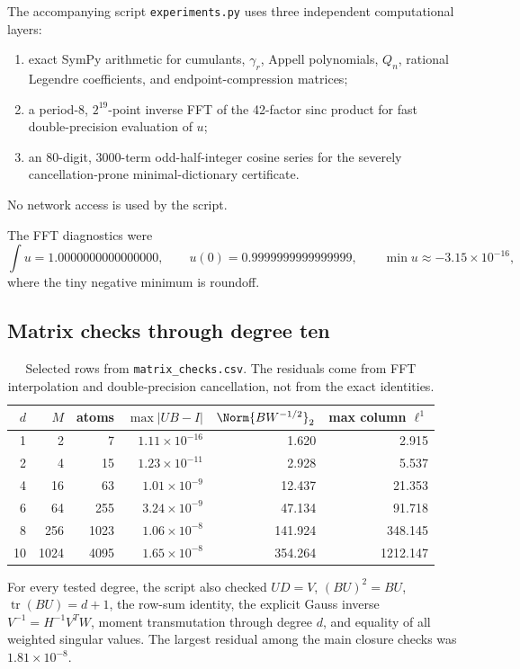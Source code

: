 \documentclass[11pt]{article}
\theoremstyle{definition}
\theoremstyle{remark}
\newcommand{\tr}{\operatorname{tr}}
\begin{document}
The accompanying script \texttt{experiments.py} uses three independent
computational layers:
\begin{enumerate}
  \item exact SymPy arithmetic for cumulants, $\gamma_r$, Appell polynomials,
  $Q_n$, rational Legendre coefficients, and endpoint-compression matrices;
  \item a period-$8$, $2^{19}$-point inverse FFT of the 42-factor sinc product
  for fast double-precision evaluation of $u$;
  \item an 80-digit, 3000-term odd-half-integer cosine series for the severely
  cancellation-prone minimal-dictionary certificate.
\end{enumerate}
No network access is used by the script.

The FFT diagnostics were
\[
 \int u=1.0000000000000000,
 \qquad
 u(0)=0.9999999999999999,
 \qquad
 \min u\approx-3.15\times10^{-16},
\]
where the tiny negative minimum is roundoff.

\subsection{Matrix checks through degree ten}

\begin{table}[H]
\centering
\small
\begin{tabular}{@{}rrrrrr@{}}
\toprule
$d$ & $M$ & atoms & $\max|UB-I|$ & $\Norm{BW^{-1/2}}_2$ & max column $\ell^1$ \\
\midrule
1  & 2    & 7    & $1.11\times10^{-16}$ & 1.620 & 2.915 \\
2  & 4    & 15   & $1.23\times10^{-11}$ & 2.928 & 5.537 \\
4  & 16   & 63   & $1.01\times10^{-9}$  & 12.437 & 21.353 \\
6  & 64   & 255  & $3.24\times10^{-9}$  & 47.134 & 91.718 \\
8  & 256  & 1023 & $1.06\times10^{-8}$  & 141.924 & 348.145 \\
10 & 1024 & 4095 & $1.65\times10^{-8}$  & 354.264 & 1212.147 \\
\bottomrule
\end{tabular}
\caption{Selected rows from \texttt{matrix\_checks.csv}.  The residuals come
from FFT interpolation and double-precision cancellation, not from the exact
identities.}
\label{tab:matrix-checks}
\end{table}

For every tested degree, the script also checked $UD=V$, $(BU)^2=BU$,
$\tr(BU)=d+1$, the row-sum identity, the explicit Gauss inverse
$V^{-1}=H^{-1}V^TW$, moment transmutation through degree $d$, and equality of
all weighted singular values.  The largest residual among the main closure
checks was $1.81\times10^{-8}$.
\end{document}

